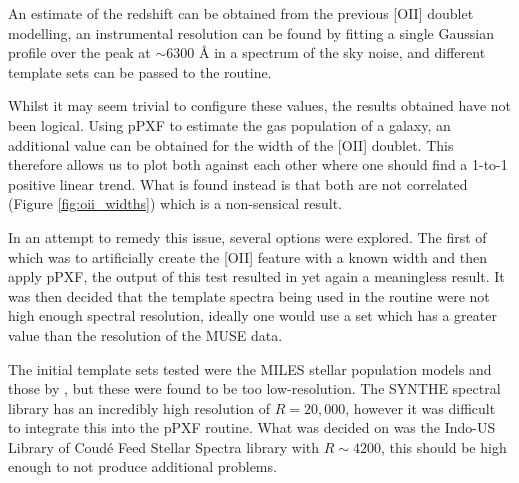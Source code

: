 \documentclass[12pt, twocolumn]{revtex4-1}    %
\begin{document}
An estimate of the redshift can be obtained from the previous [OII] doublet modelling, an instrumental resolution can be found by fitting a single Gaussian profile over the peak at $\sim6300$ {\AA} in a spectrum of the sky noise, and different template sets can be passed to the routine. 



Whilst it may seem trivial to configure these values, the results obtained have not been logical. Using pPXF to estimate the gas population of a galaxy, an additional value can be obtained for the width of the [OII] doublet. This therefore allows us to plot both against each other where one should find a 1-to-1 positive linear trend. What is found instead is that both are not correlated (Figure \ref{fig:oii_widths}) which is a non-sensical result. 

In an attempt to remedy this issue, several options were explored. The first of which was to artificially create the [OII] feature with a known width and then apply pPXF, the output of this test resulted in yet again a meaningless result. It was then decided that the template spectra being used in the routine were not high enough spectral resolution, ideally one would use a set which has a greater value than the resolution of the MUSE data. 


The initial template sets tested were the MILES stellar population models \citep{vazdekis_miles} and those by \cite{jacoby_spectra}, but these were found to be too low-resolution. The SYNTHE spectral library \citep{munari_synthe} has an incredibly high resolution of $R=20,000$, however it was difficult to integrate this into the pPXF routine. What was decided on was the Indo-US Library of Coud{\'e} Feed Stellar Spectra \citep{valdes_coude} library with $R\sim4200$, this should be high enough to not produce additional problems.
\end{document}
